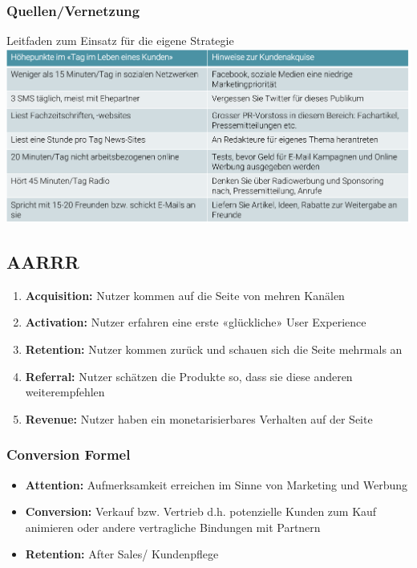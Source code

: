 \subsubsection{Quellen/Vernetzung}
Leitfaden zum Einsatz für die eigene Strategie \\
\includegraphics[width=0.5\linewidth]{images/kundensegment_quellen}

\subsection{AARRR}
\begin{enumerate}
	\item \textbf{Acquisition:} Nutzer kommen auf die Seite von mehren Kanälen
	\item \textbf{Activation:} Nutzer erfahren eine erste «glückliche» User Experience
	\item \textbf{Retention:} Nutzer kommen zurück und schauen sich die Seite mehrmals an
	\item \textbf{Referral:} Nutzer schätzen die Produkte so, dass sie diese anderen weiterempfehlen
	\item \textbf{Revenue:} Nutzer haben ein monetarisierbares Verhalten auf der Seite
\end{enumerate}

\subsubsection{Conversion Formel}
\begin{itemize}
	\item \textbf{Attention:} Aufmerksamkeit erreichen im Sinne von Marketing und Werbung
	\item \textbf{Conversion:} Verkauf bzw. Vertrieb d.h. potenzielle Kunden zum Kauf animieren oder andere vertragliche Bindungen mit Partnern
	\item \textbf{Retention:} After Sales/ Kundenpflege
\end{itemize}

